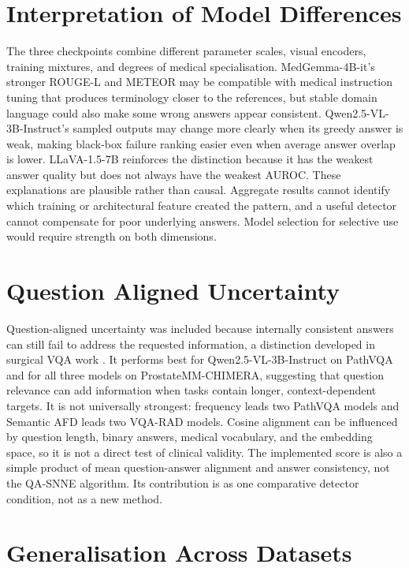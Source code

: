 \section{Interpretation of Model Differences}

The three checkpoints combine different parameter scales, visual encoders, training mixtures, and degrees of medical specialisation. MedGemma-4B-it's stronger ROUGE-L and METEOR may be compatible with medical instruction tuning that produces terminology closer to the references, but stable domain language could also make some wrong answers appear consistent. Qwen2.5-VL-3B-Instruct's sampled outputs may change more clearly when its greedy answer is weak, making black-box failure ranking easier even when average answer overlap is lower. LLaVA-1.5-7B reinforces the distinction because it has the weakest answer quality but does not always have the weakest AUROC. These explanations are plausible rather than causal. Aggregate results cannot identify which training or architectural feature created the pattern, and a useful detector cannot compensate for poor underlying answers. Model selection for selective use would require strength on both dimensions.

\section{Question Aligned Uncertainty}

Question-aligned uncertainty was included because internally consistent answers can still fail to address the requested information, a distinction developed in surgical VQA work \citep{carlini2026qasnne}. It performs best for Qwen2.5-VL-3B-Instruct on PathVQA and for all three models on ProstateMM-CHIMERA, suggesting that question relevance can add information when tasks contain longer, context-dependent targets. It is not universally strongest: frequency leads two PathVQA models and Semantic AFD leads two VQA-RAD models. Cosine alignment can be influenced by question length, binary answers, medical vocabulary, and the embedding space, so it is not a direct test of clinical validity. The implemented score is also a simple product of mean question-answer alignment and answer consistency, not the QA-SNNE algorithm. Its contribution is as one comparative detector condition, not as a new method.

\section{Generalisation Across Datasets}

